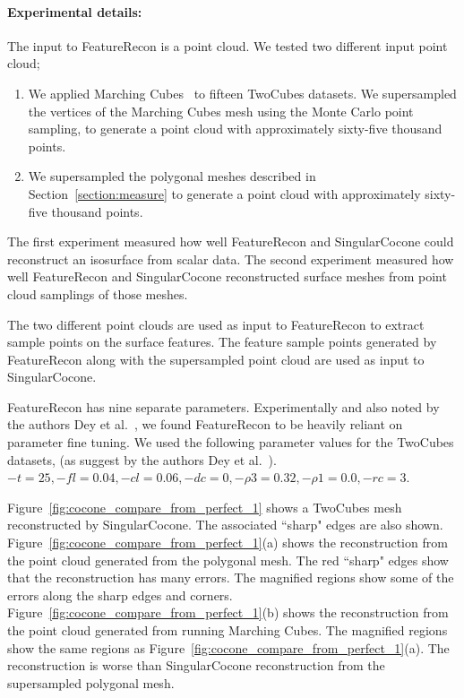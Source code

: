 \paragraph{Experimental details:} 

The input to FeatureRecon is a point cloud. 
We tested two different input point cloud;
\begin{enumerate}
\item We applied Marching Cubes~\cite{lc-mchr3-87} 
to fifteen TwoCubes datasets. 
We supersampled the vertices of the Marching Cubes mesh
using the Monte Carlo point sampling,
to generate a point cloud with approximately sixty-five thousand points.

\item We supersampled the polygonal meshes described 
in Section~\ref{section:measure}
to generate a point cloud with approximately sixty-five thousand points.
\end{enumerate}

The first experiment measured how well FeatureRecon and SingularCocone
could reconstruct an isosurface from scalar data.
The second experiment measured how well FeatureRecon and SingularCocone
reconstructed surface meshes from point cloud samplings of those meshes.

The two different point clouds are used as input to FeatureRecon to
extract sample points on the surface features.  
The feature sample points generated by FeatureRecon along with the
supersampled point cloud are used as input to SingularCocone.

FeatureRecon has nine separate
parameters. Experimentally and also noted by the authors Dey et
al.~\cite{Dey2013}, we found FeatureRecon to be heavily reliant on
parameter fine tuning. We used the following parameter values for the
TwoCubes datasets, (as suggest by the authors Dey et
al.~\cite{Dey2013}).  $-t = 25,-fl = 0.04, -cl = 0.06, -dc = 0, -\rho3
= 0.32, -\rho1 = 0.0, -rc = 3$.

Figure~\ref{fig:cocone_compare_from_perfect_1} shows 
a TwoCubes mesh reconstructed by SingularCocone.
The associated ``sharp" edges are
also shown. Figure~\ref{fig:cocone_compare_from_perfect_1}(a) shows
the reconstruction from the point cloud generated from the polygonal
mesh. The red ``sharp" edges show that the
reconstruction has many errors. The magnified regions show some of the
errors along the sharp edges and
corners. Figure~\ref{fig:cocone_compare_from_perfect_1}(b) shows the
reconstruction from the point cloud generated from running Marching
Cubes. The magnified regions show the same regions as
Figure~\ref{fig:cocone_compare_from_perfect_1}(a). The reconstruction
is worse than SingularCocone reconstruction 
from the supersampled polygonal mesh.

